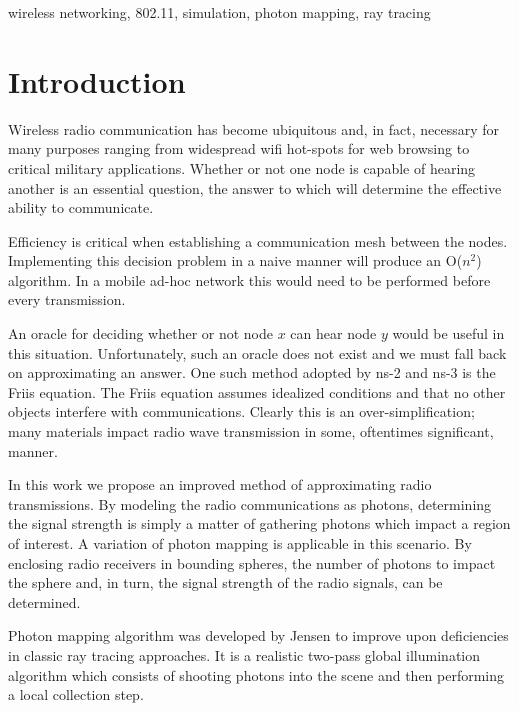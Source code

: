 \documentclass[%
        final,
        notitlepage,
        narroweqnarray,
        inline,
        twoside,
        ]{ieee}
\begin{document}
\vspace{5mm}
\begin{keywords}
wireless networking, 802.11, simulation, photon mapping, ray tracing
\end{keywords}

\section{Introduction}

Wireless radio communication has become ubiquitous and, in fact, necessary for 
many purposes ranging from widespread wifi hot-spots for web browsing to 
critical military applications.  Whether or not one node is capable of 
hearing another is an essential question, the answer to which will 
determine the effective ability to communicate.

Efficiency is critical when establishing a communication mesh between the
nodes. Implementing this decision problem
in a naive manner will produce an O($n^2$) algorithm.  In a mobile ad-hoc
network this would need to be performed before every transmission.

An oracle for deciding whether or not node $x$ can hear node $y$ would be useful 
in this situation.  Unfortunately, such an oracle does not exist and we must 
fall back on approximating an answer.  One such method adopted by ns-2 and 
ns-3 is the Friis \cite{1697062} equation.  The Friis equation assumes
idealized 
conditions and that no other objects interfere with communications.  Clearly 
this is an over-simplification; many materials impact radio wave transmission 
in some, oftentimes significant, manner.

In this work we propose an improved method of approximating radio 
transmissions.  By modeling the radio communications as photons, determining 
the signal strength is simply a matter of gathering photons which impact a 
region of interest.  A variation of photon mapping is applicable in this
scenario.  By enclosing radio receivers in bounding spheres, the number of
photons to impact the sphere and, in turn, the signal strength of the radio
signals, can be determined.

Photon mapping algorithm was developed by Jensen \cite{Jensen96globalillumination} 
to improve upon deficiencies in classic ray tracing approaches.  It is a
realistic two-pass global illumination algorithm which consists of shooting
photons into the scene and then performing a local collection step.
\end{document}
